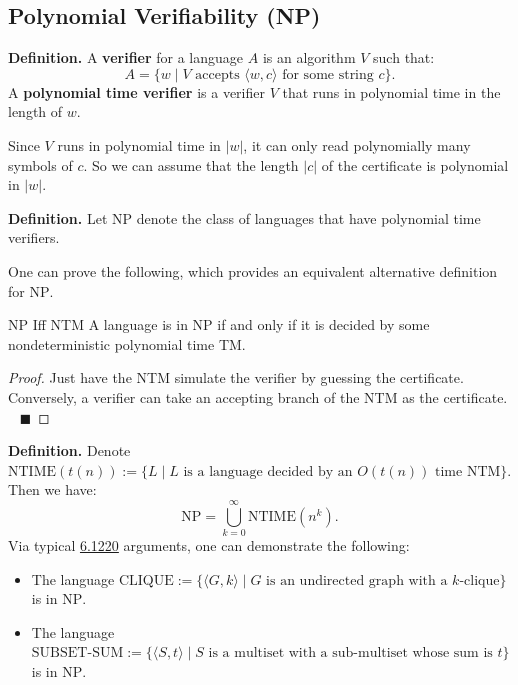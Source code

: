 \subsection{Polynomial Verifiability (NP)}

\textbf{Definition.}
A \textbf{verifier} for a language $A$ is an algorithm $V$
such that:
\[
    A = \{ w \mid V \text{ accepts } \langle w, c \rangle
    \text{ for some string } c \}.
\]
A \textbf{polynomial time verifier} is a verifier $V$
that runs in polynomial time in the length of $w$.

\begin{remark}
    Since $V$ runs in polynomial time in $|w|$,
    it can only read polynomially many symbols of $c$.
    So we can assume that the length $|c|$ of the certificate
    is polynomial in $|w|$.
\end{remark}

\textbf{Definition.}
Let $\mathrm{NP}$ denote the class of languages
that have polynomial time verifiers.

One can prove the following,
which provides an equivalent alternative definition for $\mathrm{NP}$.

\begin{theorem}{NP Iff NTM}
    A language is in $\mathrm{NP}$
    if and only if it is decided
    by some nondeterministic polynomial time TM.
\end{theorem}

\begin{proof}
    Just have the NTM simulate the verifier by guessing the certificate.
    Conversely, a verifier can take an accepting branch of the NTM as the certificate.
    ~ $\blacksquare$
\end{proof}

\textbf{Definition.}
Denote $\mathrm{NTIME}(t(n)) := \{
    L \mid L \text{ is a language decided by an }
    O(t(n)) \text{ time NTM}
\}$.  Then we have:
\[
    \mathrm{NP} = \bigcup_{k = 0}^{\infty} \mathrm{NTIME}(n^k).
\]
Via typical \href{/6.1220/lectures/14/}{6.1220} arguments,
one can demonstrate the following:
\begin{itemize}
    \item The language $\mathrm{CLIQUE} := \{
        \langle G, k \rangle \mid
        G \text{ is an undirected graph with a } k\text{-clique}
    \}$ is in $\mathrm{NP}$.
    \item The language $\mathrm{SUBSET}\text{-}\mathrm{SUM} := \{
        \langle S, t \rangle \mid
        S \text{ is a multiset with a sub-multiset whose sum is } t
    \}$ is in $\mathrm{NP}$.
\end{itemize}

